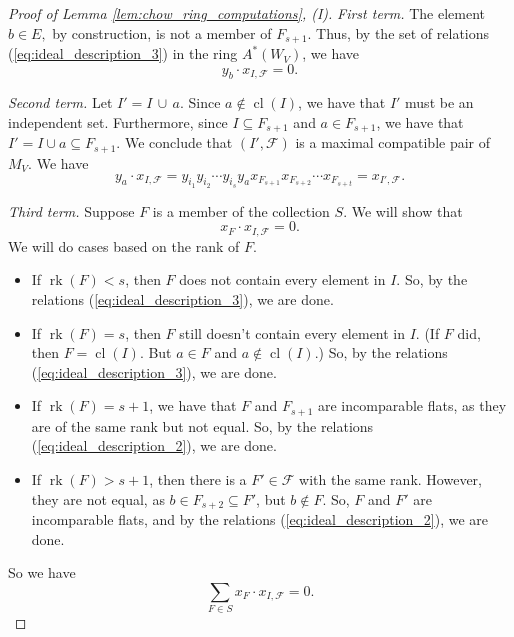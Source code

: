 \documentclass[10pt,a4paper]{amsart}
\newcommand{\cl}{\operatorname{cl}}
\newcommand{\rk}{\operatorname{rk}}
\begin{document}
\begin{proof}[Proof of Lemma \ref{lem:chow_ring_computations}, (I)]
\noindent
\textit{First term.} The element $b\in E,$ by construction, is not a member of $F_{s+1}$. Thus, by the set of relations (\ref{eq:ideal_description_3}) in the ring $A^*(W_V)$, we have
\begin{equation*}
y_b \cdot x_{I, \mathscr{F}} = 0.
\end{equation*}

\noindent
\textit{Second term.} Let $I' = I \, \cup \, a$. Since $a \notin \cl(I)$, we have that $I'$ must be an independent set. Furthermore, since $I \subseteq F_{s+1}$ and $a \in F_{s+1}$, we have that $I' = I \cup a \subseteq F_{s+1}$. We conclude that $(I', \mathscr{F})$ is a maximal compatible pair of $M_V$. We have
\begin{equation*}
y_a \cdot x_{I, \mathscr{F}} = y_{i_1}y_{i_2}\cdots y_{i_s} y_{a} x_{F_{s+1}}x_{F_{s+2}}\cdots x_{F_{s+t}} = x_{I',\mathscr{F}}. 
\end{equation*}

\noindent
\textit{Third term.} Suppose $F$ is a member of the collection $S$. We will show that \[x_F \cdot x_{I , \mathscr{F}} = 0.\]
We will do cases based on the rank of $F$.
\begin{itemize}

\item If $\rk(F) < s$, then $F$ does not contain every element in $I$. So, by the relations (\ref{eq:ideal_description_3}), we are done.

\item If $\rk(F) = s$, then $F$ still doesn't contain every element in $I$. (If $F$ did, then $F = \cl(I)$. But $a\in F$ and $a \notin \cl(I)$.) So, by the relations (\ref{eq:ideal_description_3}), we are done.

\item If $\rk(F) = s+1$, we have that $F$ and $F_{s+1}$ are incomparable flats, as they are of the same rank but not equal. So, by the relations (\ref{eq:ideal_description_2}), we are done.

\item If $\rk(F) > s+1$, then there is a $F' \in \mathscr{F}$ with the same rank. However, they are not equal, as $b\in F_{s+2} \subseteq F'$, but $b \notin F$. So, $F$ and $F'$ are incomparable flats, and by the relations (\ref{eq:ideal_description_2}), we are done.
\end{itemize}
So we have
\begin{equation*}
\sum_{F \in S}x_F \cdot x_{I,\mathscr{F}} = 0.
\end{equation*}


\end{proof}
\end{document}

